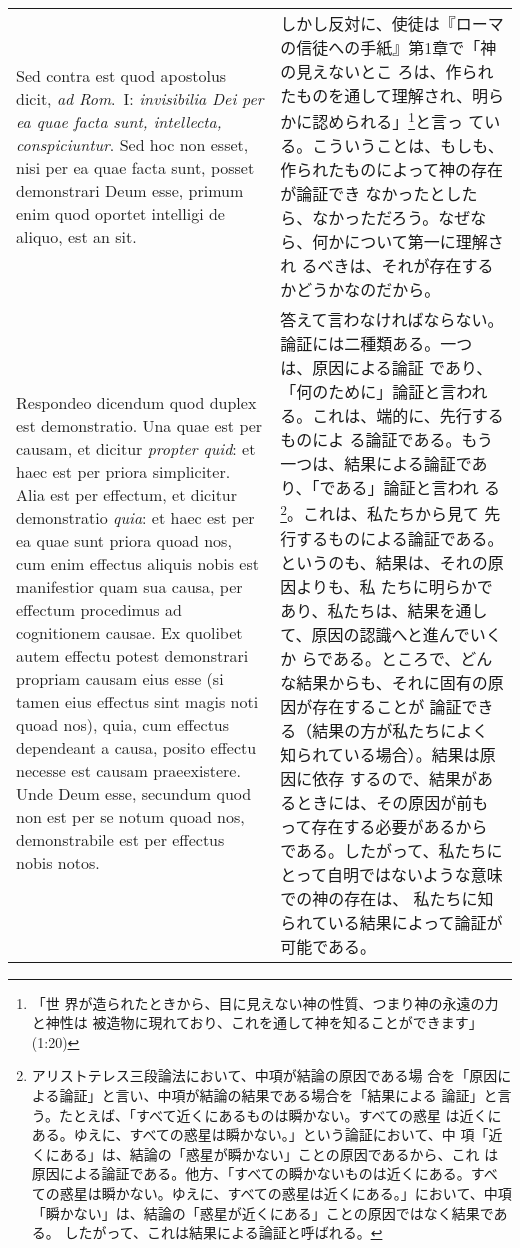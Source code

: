\documentclass[10pt]{jsarticle}
\begin{document}
\begin{longtable}{p{21em}p{21em}}
{\sc Sed contra est} quod apostolus dicit, {\it ad Rom}.~I: {\it
invisibilia Dei per ea quae facta sunt, intellecta,
conspiciuntur}. Sed hoc non esset, nisi per ea quae facta sunt, posset
demonstrari Deum esse, primum enim quod oportet intelligi de aliquo,
est an sit.

&

しかし反対に、使徒は『ローマの信徒への手紙』第1章で「神の見えないとこ
ろは、作られたものを通して理解され、明らかに認められる」\footnote{「世
界が造られたときから、目に見えない神の性質、つまり神の永遠の力と神性は
被造物に現れており、これを通して神を知ることができます」(1:20)}と言っ
ている。こういうことは、もしも、作られたものによって神の存在が論証でき
なかったとしたら、なかっただろう。なぜなら、何かについて第一に理解され
るべきは、それが存在するかどうかなのだから。

\\

{\sc Respondeo dicendum} quod duplex est demonstratio. Una quae est
per causam, et dicitur {\it propter quid}: et haec est per priora
simpliciter. Alia est per effectum, et dicitur demonstratio {\it
quia}: et haec est per ea quae sunt priora quoad nos, cum enim
effectus aliquis nobis est manifestior quam sua causa, per effectum
procedimus ad cognitionem causae. Ex quolibet autem effectu potest
demonstrari propriam causam eius esse (si tamen eius effectus sint
magis noti quoad nos), quia, cum effectus dependeant a causa, posito
effectu necesse est causam praeexistere. Unde Deum esse, secundum quod
non est per se notum quoad nos, demonstrabile est per effectus nobis
notos.

&

答えて言わなければならない。論証には二種類ある。一つは、原因による論証
であり、「何のために」論証と言われる。これは、端的に、先行するものによ
る論証である。もう一つは、結果による論証であり、「である」論証と言われ
る\footnote {アリストテレス三段論法において、中項が結論の原因である場
合を「原因による論証」と言い、中項が結論の結果である場合を「結果による
論証」と言う。たとえば、「すべて近くにあるものは瞬かない。すべての惑星
は近くにある。ゆえに、すべての惑星は瞬かない。」という論証において、中
項「近くにある」は、結論の「惑星が瞬かない」ことの原因であるから、これ
は原因による論証である。他方、「すべての瞬かないものは近くにある。すべ
ての惑星は瞬かない。ゆえに、すべての惑星は近くにある。」において、中項
「瞬かない」は、結論の「惑星が近くにある」ことの原因ではなく結果である。
したがって、これは結果による論証と呼ばれる。}。これは、私たちから見て
先行するものによる論証である。というのも、結果は、それの原因よりも、私
たちに明らかであり、私たちは、結果を通して、原因の認識へと進んでいくか
らである。ところで、どんな結果からも、それに固有の原因が存在することが
論証できる（結果の方が私たちによく知られている場合）。結果は原因に依存
するので、結果があるときには、その原因が前もって存在する必要があるから
である。したがって、私たちにとって自明ではないような意味での神の存在は、
私たちに知られている結果によって論証が可能である。


\end{longtable}
\end{document}
